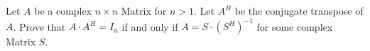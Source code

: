 Let \(A\) be a complex \(n \times n\) Matrix for \(n >1\). Let \(A^{H}\) be the conjugate transpose of \(A\).
Prove that \(A\cdot A^{H} =I_{n}\) if and only if \(A=S\cdot (S^{H})^{-1}\) for some complex Matrix \(S\).